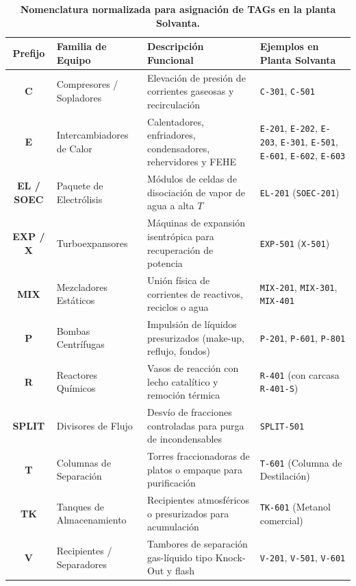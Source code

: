 \documentclass[10pt,letterpaper]{article}
\begin{document}
\begin{table}[H]
\centering
\small
\caption{\textbf{Nomenclatura normalizada para asignación de TAGs en la planta Solvanta.}} \label{tab:cuadro5}
\begin{tabularx}{\textwidth}{c l X p{4.2cm}}
\toprule
\textbf{Prefijo} & \textbf{Familia de Equipo} & \textbf{Descripción Funcional} & \textbf{Ejemplos en Planta Solvanta} \\
\midrule
\textbf{C} & Compresores / Sopladores & Elevación de presión de corrientes gaseosas y recirculación & \texttt{C-301}, \texttt{C-501} \\
\textbf{E} & Intercambiadores de Calor & Calentadores, enfriadores, condensadores, rehervidores y FEHE & \texttt{E-201}, \texttt{E-202}, \texttt{E-203}, \texttt{E-301}, \texttt{E-501}, \texttt{E-601}, \texttt{E-602}, \texttt{E-603} \\
\textbf{EL / SOEC} & Paquete de Electrólisis & Módulos de celdas de disociación de vapor de agua a alta $T$ & \texttt{EL-201} (\texttt{SOEC-201}) \\
\textbf{EXP / X} & Turboexpansores & Máquinas de expansión isentrópica para recuperación de potencia & \texttt{EXP-501} (\texttt{X-501}) \\
\textbf{MIX} & Mezcladores Estáticos & Unión física de corrientes de reactivos, reciclos o agua & \texttt{MIX-201}, \texttt{MIX-301}, \texttt{MIX-401} \\
\textbf{P} & Bombas Centrífugas & Impulsión de líquidos presurizados (make-up, reflujo, fondos) & \texttt{P-201}, \texttt{P-601}, \texttt{P-801} \\
\textbf{R} & Reactores Químicos & Vasos de reacción con lecho catalítico y remoción térmica & \texttt{R-401} (con carcasa \texttt{R-401-S}) \\
\textbf{SPLIT} & Divisores de Flujo & Desvío de fracciones controladas para purga de incondensables & \texttt{SPLIT-501} \\
\textbf{T} & Columnas de Separación & Torres fraccionadoras de platos o empaque para purificación & \texttt{T-601} (Columna de Destilación) \\
\textbf{TK} & Tanques de Almacenamiento & Recipientes atmosféricos o presurizados para acumulación & \texttt{TK-601} (Metanol comercial) \\
\textbf{V} & Recipientes / Separadores & Tambores de separación gas-líquido tipo Knock-Out y flash & \texttt{V-201}, \texttt{V-501}, \texttt{V-601} \\
\bottomrule
\end{tabularx}
\end{table}
\end{document}
